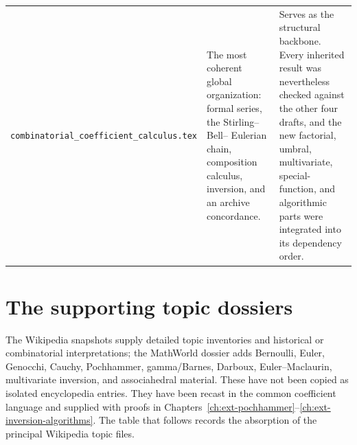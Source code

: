 \documentclass[11pt,a4paper,oneside,openany]{book}
\theoremstyle{definition}
\theoremstyle{remark}
\begin{document}
\begin{longtable}{>{\raggedright\arraybackslash}p{}
                  >{\raggedright\arraybackslash}p{}
                  >{\raggedright\arraybackslash}p{}}
\nolinkurl{combinatorial_coefficient_calculus.tex}
& The most coherent global organization: formal series, the Stirling--Bell--
  Eulerian chain, composition calculus, inversion, and an archive concordance.
& Serves as the structural backbone.  Every inherited result was nevertheless
  checked against the other four drafts, and the new factorial, umbral,
  multivariate, special-function, and algorithmic parts were integrated into
  its dependency order.\\
\end{longtable}
\renewcommand{\arraystretch}{1}

\section{The supporting topic dossiers}
The Wikipedia snapshots supply detailed topic inventories and historical or
combinatorial interpretations; the MathWorld dossier adds Bernoulli, Euler,
Genocchi, Cauchy, Pochhammer, gamma/Barnes, Darboux, Euler--Maclaurin,
multivariate inversion, and associahedral material.  These have not been copied
as isolated encyclopedia entries.  They have been recast in the common
coefficient language and supplied with proofs in
Chapters~\ref{ch:ext-pochhammer}--\ref{ch:ext-inversion-algorithms}.  The table
that follows records the absorption of the principal Wikipedia topic files.
\end{document}
